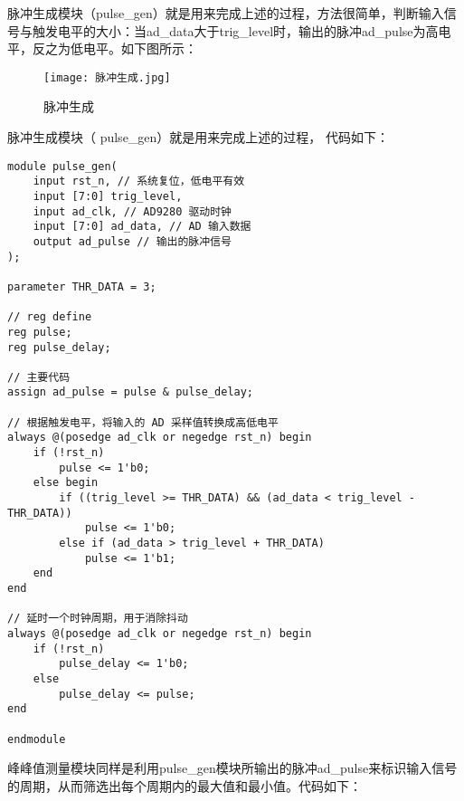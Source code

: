 \documentclass[lang=cn,a4paper,newtx]{elegantpaper}
\begin{document}
脉冲生成模块（pulse\_gen）就是用来完成上述的过程，方法很简单，判断输入信号与触发电平的大小：当ad\_data大于trig\_level时，输出的脉冲ad\_pulse为高电平，反之为低电平。如下图所示：
  \begin{figure}[!htb]
	\centering
	\caption{脉冲生成}
	\label{脉冲生成}
	\texttt{[image: 脉冲生成.jpg]}
\end{figure}
脉冲生成模块（ pulse\_gen）就是用来完成上述的过程， 代码如下：
\begin{lstlisting}
module pulse_gen(
    input rst_n, // 系统复位，低电平有效
    input [7:0] trig_level,
    input ad_clk, // AD9280 驱动时钟
    input [7:0] ad_data, // AD 输入数据
    output ad_pulse // 输出的脉冲信号
);

parameter THR_DATA = 3;

// reg define
reg pulse;
reg pulse_delay;

// 主要代码
assign ad_pulse = pulse & pulse_delay;

// 根据触发电平，将输入的 AD 采样值转换成高低电平
always @(posedge ad_clk or negedge rst_n) begin
    if (!rst_n)
        pulse <= 1'b0;
    else begin
        if ((trig_level >= THR_DATA) && (ad_data < trig_level - THR_DATA))
            pulse <= 1'b0;
        else if (ad_data > trig_level + THR_DATA)
            pulse <= 1'b1;
    end
end

// 延时一个时钟周期，用于消除抖动
always @(posedge ad_clk or negedge rst_n) begin
    if (!rst_n)
        pulse_delay <= 1'b0;
    else
        pulse_delay <= pulse;
end

endmodule

\end{lstlisting}
峰峰值测量模块同样是利用pulse\_gen模块所输出的脉冲ad\_pulse来标识输入信号的周期，从而筛选出每个周期内的最大值和最小值。代码如下：
\end{document}
